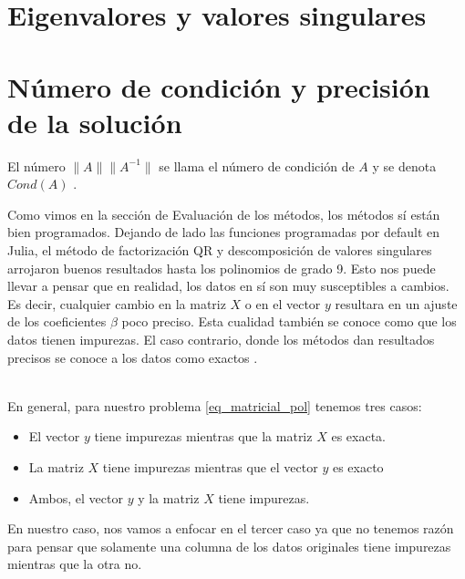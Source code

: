 \section{Eigenvalores y valores singulares}

\section{Número de condición y precisión de la solución}

\begin{definition}
El número $\parallel A \parallel  \parallel A^{-1} \parallel$ se llama el número de condición de $A$ y se denota $Cond(A)$ \cite{numerical_linear_algebra}. 
\end{definition}

Como vimos en la sección de Evaluación de los métodos, los métodos sí están bien programados. Dejando de lado las funciones programadas por default en Julia, el método de factorización QR y descomposición de valores singulares arrojaron buenos resultados hasta los polinomios de grado 9. Esto nos puede llevar a pensar que en realidad, los datos en sí son muy susceptibles a cambios. Es decir, cualquier cambio en la matriz $X$ o en el vector $y$ resultara en un ajuste de los coeficientes $\beta$ poco preciso. Esta cualidad también se conoce como que los datos tienen impurezas. El caso contrario, donde los métodos dan resultados precisos se conoce a los datos como exactos \cite{numerical_linear_algebra}.

\\

En general, para nuestro problema \ref{eq_matricial_pol} tenemos tres casos: 
\begin{itemize}
    \item El vector $y$ tiene impurezas mientras que la matriz $X$ es exacta.
    
    \item La matriz $X$ tiene impurezas mientras que el vector $y$ es exacto
    
    \item Ambos, el vector $y$ y la matriz $X$ tiene impurezas. 
\end{itemize}

En nuestro caso, nos vamos a enfocar en el tercer caso ya que no tenemos razón para pensar que solamente una columna de los datos originales tiene impurezas mientras que la otra no. 


